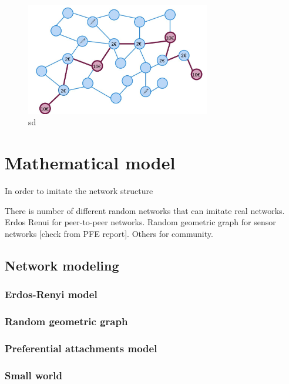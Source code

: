 \documentclass[12pt]{report}
\begin{document}
\begin{figure}[h]
  \begin{minipage}[c]{0.67\textwidth}
    \includegraphics[width=0.72\textwidth]{skipping3}
  \end{minipage}\hfill
  \begin{minipage}[c]{0.3\textwidth}
    \caption{
sd
    } 
  \end{minipage}
\end{figure}

\chapter{Mathematical model}

In order to imitate the network structure 


There is number of different random networks that can imitate real networks. Erdos Renui for peer-to-peer networks. Random geometric graph for sensor networks [check from PFE report]. Others for community.
\section{Network modeling}

\subsection{Erdos-Renyi model}

\subsection{Random geometric graph}

\subsection{Preferential attachments model}

\subsection{Small world}
\end{document}
